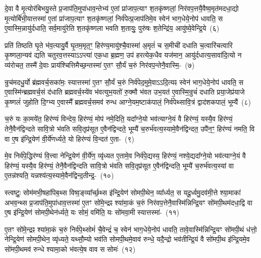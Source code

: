 {\anuvakamend[{धा॒रय॑द्वतो मरुतो गच्छति॒ विश॒मवै॒तद॒ष्टाद॑श च}]}

दे॒वा वै मृ॒त्योर॑बिभयु॒स्ते प्र॒जा\-प॑ति॒मुपा॑धाव॒न्तेभ्य॑ ए॒तां प्रा॑जाप॒त्याꣳ श॒तकृ॑ष्णलां॒ निर॑वप॒त्तयै॒वैष्व॒मृत॑मदधा॒द्यो मृ॒त्योर्बि॑भी॒यात्तस्मा॑ ए॒तां प्रा॑जाप॒त्याꣳ श॒तकृ॑ष्णलां॒ निर्व॑पेत्प्र॒जा\-प॑तिमे॒व स्वेन॑ भाग॒धेये॒नोप॑ धावति॒ स ए॒वास्मि॒न्नायु॑र्दधाति॒ सर्व॒मायु॑रेति श॒तकृ॑ष्णला भवति श॒तायुः॒ पुरु॑षः श॒तेन्द्रि॑य॒ आयु॑ष्ये॒वेन्द्रि॒ये~(६)\ip

प्रति॑ तिष्ठति घृ॒ते भ॑व॒त्यायु॒र्वै घृ॒तम॒मृत॒ꣳ॒ हिर॑ण्य॒मायु॑श्चै॒वा\-स्मा॑ अ॒मृतं॑ च स॒मीची॑ दधाति च॒त्वारि॑चत्वारि कृ॒ष्णला॒न्यव॑ द्यति चतुरव॒त्तस्या\-ऽऽ\-प्त्या॑ एक॒धा ब्र॒ह्मण॒ उप॑ हरत्येक॒धैव यज॑मान॒ आयु॑र्दधात्य॒सावा॑दि॒त्यो न व्य॑रोचत॒ तस्मै॑ दे॒वाः प्राय॑श्चित्ति\-मैच्छ॒न्तस्मा॑ ए॒तꣳ सौ॒र्यं च॒रुं निर॑वप॒न्तेनै॒वास्मि॒-~(७)\ip

न्रुच॑मदधु॒र्यो ब्र॑ह्मवर्च॒सका॑मः॒ स्यात्तस्मा॑ ए॒तꣳ सौ॒र्यं च॒रुं निर्व॑पेद॒मुमे॒वा\-ऽऽ\-दि॒त्यꣴ स्वेन॑ भाग॒धेये॒नोप॑ धावति॒ स ए॒वास्मि॑न्ब्रह्मवर्च॒सं द॑धाति ब्रह्मवर्च॒स्ये॑व भ॑वत्युभ॒यतो॑ रु॒क्मौ भ॑वत उभ॒यत॑ ए॒वास्मि॒न्रुचं॑ दधाति प्रया॒जेप्र॑याजे कृ॒ष्णलं॑ जुहोति दि॒ग्भ्य ए॒वास्मै᳚ ब्रह्मवर्च॒समव॑ रुन्ध आग्ने॒यम॒ष्टा\-क॑पालं॒ निर्व॑पेथ्सावि॒त्रं द्वाद॑श\-कपालं॒ भूम्यै॑~(८)\ip

च॒रुं यः का॒मये॑त॒ हिर॑ण्यं विन्देय॒ हिर॑ण्यं॒ मोप॑ नमे॒दिति॒ यदा᳚ग्ने॒यो भव॑त्याग्ने॒यं वै हिर॑ण्यं॒ यस्यै॒व हिर॑ण्यं॒ तेनै॒वैन॑द्विन्दते सावि॒त्रो भ॑वति सवि॒तृप्र॑सूत ए॒वैन॑द्विन्दते॒ भूम्यै॑ च॒रुर्भ॑वत्य॒स्यामे॒वैन॑द्विन्दत॒ उपै॑न॒ꣳ॒ हिर॑ण्यं नमति॒ वि वा ए॒ष इ॑न्द्रि॒येण॑ वी॒र्ये॑णर्ध्यते॒ यो हिर॑ण्यं वि॒न्दत॑ ए॒ता-~(९)\ip

मे॒व निर्व॑पे॒द्धिर॑ण्यं वि॒त्त्वा नेन्द्रि॒येण॑ वी॒र्ये॑ण॒ व्यृ॑ध्यत ए॒तामे॒व निर्व॑पे॒द्यस्य॒ हिर॑ण्यं॒ नश्ये॒द्यदा᳚ग्ने॒यो भव॑त्याग्ने॒यं वै हिर॑ण्यं॒ यस्यै॒व हिर॑ण्यं॒ तेनै॒वैन॑द्विन्दति सावि॒त्रो भ॑वति सवि॒तृप्र॑सूत ए॒वैन॑द्विन्दति॒ भूम्यै॑ च॒रुर्भ॑वत्य॒स्यां वा ए॒तन्न॑श्यति॒ यन्नश्य॑त्य॒स्यामे॒वैन॑द्विन्द॒ती\-न्द्र॒-~(१०)\ip

स्त्वष्टुः॒ सोम॑मभी॒षहा॑पिब॒थ्स विष्व॒ङ्व्या᳚र्च्छ॒थ्स इ॑न्द्रि॒येण॑ सोमपी॒थेन॒ व्या᳚र्ध्यत॒ स यदू॒र्ध्वमु॒दव॑मी॒त्ते श्या॒माका॑ अभव॒न्थ्स प्र॒जा\-प॑ति॒मुपा॑धाव॒त्तस्मा॑ ए॒तꣳ सो॑मे॒न्द्रꣴ श्या॑मा॒कं च॒रुं निर॑वप॒त्तेनै॒वास्मि॑न्निन्द्रि॒यꣳ सो॑मपी॒थम॑दधा॒द्वि वा ए॒ष इ॑न्द्रि॒येण॑ सोमपी॒थेन॑र्ध्यते॒ यः सोमं॒ वमि॑ति॒ यः सो॑मवा॒मी स्यात्तस्मा॑-~(११)\ip

ए॒तꣳ सो॑मे॒न्द्रꣴ श्या॑मा॒कं च॒रुं निर्व॑पे॒थ्सोमं॑ चै॒वेन्द्रं॑ च॒ स्वेन॑ भाग॒धेये॒नोप॑ धावति॒ तावे॒वास्मि॑न्निन्द्रि॒यꣳ सो॑मपी॒थं ध॑त्तो॒ नेन्द्रि॒येण॑ सोमपी॒थेन॒ व्यृ॑ध्यते॒ यथ्सौ॒म्यो भव॑ति सोमपी॒थमे॒वाव॑ रुन्धे॒ यदै॒न्द्रो भव॑तीन्द्रि॒यं वै सो॑मपी॒थ इ॑न्द्रि॒यमे॒व सो॑मपी॒थमव॑ रुन्धे श्यामा॒को भ॑वत्ये॒ष वाव स सोमः॑~(१२)\ip

